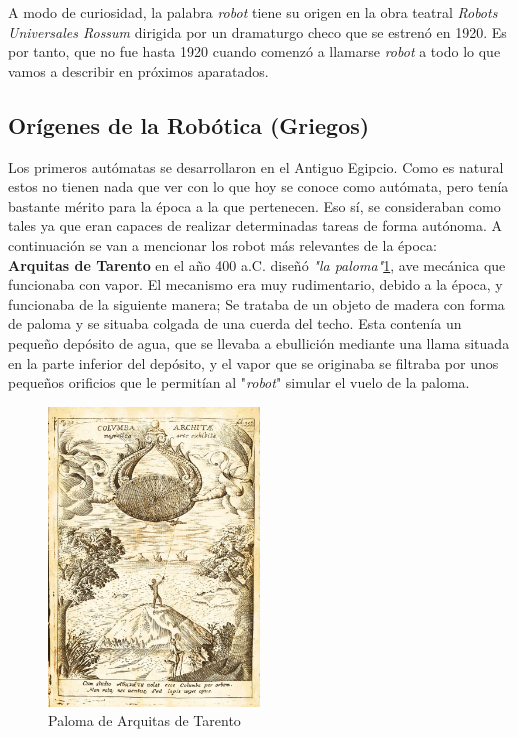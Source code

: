 \documentclass[paper=a4, fontsize=11pt]{scrartcl}
\begin{document}
A modo de curiosidad, la palabra \textit{robot} tiene su origen en la obra teatral \textit{Robots Universales Rossum} dirigida por un dramaturgo checo que se estrenó en 1920. Es por tanto, que no fue hasta 1920 cuando comenzó a llamarse \textit{robot} a todo lo que vamos a describir en próximos aparatados.

\subsection{Orígenes de la Robótica (Griegos)}

Los primeros autómatas se desarrollaron en el Antiguo Egipcio. Como es natural estos no tienen nada que ver con lo que hoy se conoce como autómata, pero tenía bastante mérito para la época a la que pertenecen. Eso sí, se consideraban como tales ya que eran capaces de realizar determinadas tareas de forma autónoma. A continuación se van a mencionar los robot más relevantes de la época:\\

 \textbf{Arquitas de Tarento} en el año 400 a.C. diseñó \textit{"la paloma"}\ref{paloma}, ave mecánica que funcionaba con vapor. El mecanismo era muy rudimentario, debido a la época, y funcionaba de la siguiente manera; Se trataba de un objeto de madera con forma de paloma y se situaba colgada de una cuerda del techo. Esta contenía un pequeño depósito de agua, que se llevaba a ebullición mediante una llama situada en la parte inferior del depósito, y el vapor que se originaba se filtraba por unos pequeños orificios que le permitían al "\textit{robot}" simular el vuelo de la paloma.\\
 
\begin{figure}[H]
\begin{center}
  \includegraphics[width=0.5\textwidth]{imagenes/paloma.jpg}
  \caption{Paloma de Arquitas de Tarento}
  \label{paloma}
\end{center}
\end{figure}
\end{document}
